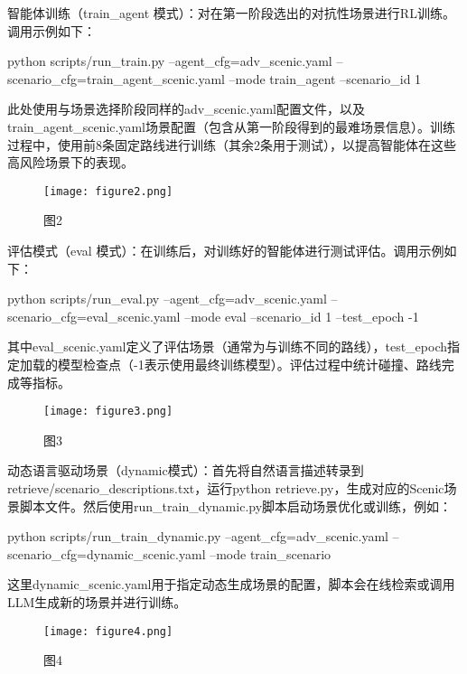 智能体训练（train\_agent 模式）：对在第一阶段选出的对抗性场景进行RL训练。调用示例如下：

python scripts/run\_train.py --agent\_cfg=adv\_scenic.yaml --scenario\_cfg=train\_agent\_scenic.yaml --mode train\_agent --scenario\_id 1

此处使用与场景选择阶段同样的adv\_scenic.yaml配置文件，以及train\_agent\_scenic.yaml场景配置（包含从第一阶段得到的最难场景信息）。训练过程中，使用前8条固定路线进行训练（其余2条用于测试），以提高智能体在这些高风险场景下的表现。


\begin{figure}[htbp]
	\centering
	\texttt{[image: figure2.png]} %
	\caption{图2} %
	\label{fig:example} %
\end{figure}



评估模式（eval 模式）：在训练后，对训练好的智能体进行测试评估。调用示例如下：

python scripts/run\_eval.py --agent\_cfg=adv\_scenic.yaml --scenario\_cfg=eval\_scenic.yaml --mode eval --scenario\_id 1 --test\_epoch -1

其中eval\_scenic.yaml定义了评估场景（通常为与训练不同的路线），test\_epoch指定加载的模型检查点（-1表示使用最终训练模型）。评估过程中统计碰撞、路线完成等指标。



\begin{figure}[htbp]
	\centering
	\texttt{[image: figure3.png]} %
	\caption{图3} %
	\label{fig:example} %
\end{figure}



动态语言驱动场景（dynamic模式）：首先将自然语言描述转录到retrieve/scenario\_descriptions.txt，运行python retrieve.py，生成对应的Scenic场景脚本文件。然后使用run\_train\_dynamic.py脚本启动场景优化或训练，例如：

python scripts/run\_train\_dynamic.py --agent\_cfg=adv\_scenic.yaml --scenario\_cfg=dynamic\_scenic.yaml --mode train\_scenario

这里dynamic\_scenic.yaml用于指定动态生成场景的配置，脚本会在线检索或调用LLM生成新的场景并进行训练。


\begin{figure}[htbp]
	\centering
	\texttt{[image: figure4.png]} %
	\caption{图4} %
	\label{fig:example} %
\end{figure}



